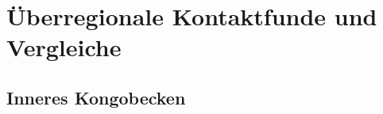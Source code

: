 


















\section{Überregionale Kontaktfunde und Vergleiche}

\subsection{Inneres Kongobecken}\label{sec:InneresKongobeckenGruppen}









